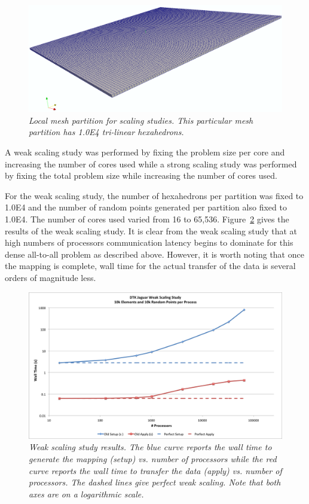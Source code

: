 \documentclass{mc2013}
\begin{document}
\begin{figure}[htpb!]
  \centering \includegraphics[width=5.5in]{mesh.png}
  \caption{\sl Local mesh partition for scaling studies. This
    particular mesh partition has 1.0E4 tri-linear hexahedrons.}
  \label{fig:mesh_partition}
\end{figure}

A weak scaling study was performed by fixing the problem size per core
and increasing the number of cores used while a strong scaling study
was performed by fixing the total problem size while increasing the
number of cores used.

\label{subsec:weak_scaling}
For the weak scaling study, the number of hexahedrons per partition
was fixed to 1.0E4 and the number of random points generated per
partition also fixed to 1.0E4. The number of cores used varied from 16
to 65,536. Figure~\ref{fig:weak_scaling} gives the results of the weak
scaling study. It is clear from the weak scaling study that at high
numbers of processors communication latency begins to dominate for
this dense all-to-all problem as described above. However, it is worth
noting that once the mapping is complete, wall time for the actual
transfer of the data is several orders of magnitude less.

\begin{figure}[htpb!]
  \centering
  \includegraphics[width=5.5in]{WeakScaling.png}
  \caption{\sl Weak scaling study results. The blue curve reports the
    wall time to generate the mapping (setup) vs. number of processors
    while the red curve reports the wall time to transfer the data
    (apply) vs. number of processors. The dashed lines give perfect
    weak scaling. Note that both axes are on a logarithmic scale. }
  \label{fig:weak_scaling}
\end{figure}
\end{document}
